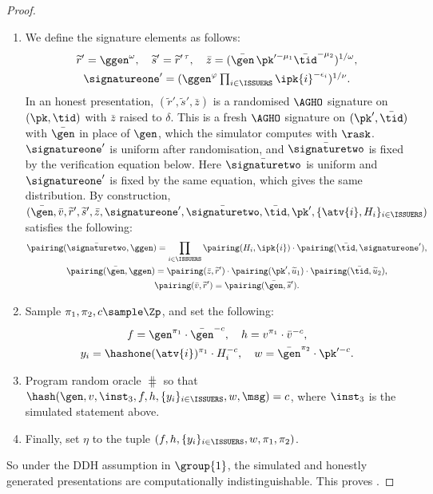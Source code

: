 \begin{proof}
\begin{enumerate}
    \item We define the signature elements as follows:
%
      \begin{gather*}
%
	\widetilde{r}' = \ggen^\omega, \quad \widetilde{s}' =
\widetilde{r}'^{\,\tau}, \quad \bar{z} = (\bar{\gen}\,\pk'^{-\mu_1}
\bar{\tid}^{-\mu_2})^{1/\omega}, \\ \signatureone' =
(\ggen^{\varphi}\textstyle\prod_{i \in \ISSUERS}\ipk{i}^{-\epsilon_i})^{1/\nu}.
%
      \end{gather*}
%
      In an honest presentation, $(\widetilde{r}', \widetilde{s}', \bar{z})$
is a randomised $\AGHO$ signature on $(\pk, \tid)$ with $\bar{z}$ raised to
$\delta$. This is a fresh $\AGHO$ signature on $(\pk', \bar{\tid})$ with
$\bar{\gen}$ in place of $\gen$, which the simulator computes with $\rask$.
$\signatureone'$ is uniform after randomisation, and $\bar{\signaturetwo}$ is
fixed by the verification equation below. Here $\bar{\signaturetwo}$ is uniform
and $\signatureone'$ is fixed by the same equation, which gives the same
distribution.
      By construction, $(\bar{\gen}, \bar{v}, \widetilde{r}',
\widetilde{s}', \bar{z}, \signatureone', \bar{\signaturetwo}, \bar{\tid}, \pk',
\{\atv{i}, H_i\}_{i\in \ISSUERS})$ satisfies the following:
      \begin{gather*}
	\pairing(\bar{\signaturetwo}, \ggen) =
\prod_{i\in\ISSUERS}\pairing(H_i,\ipk{i}) \cdot
\pairing(\bar{\tid},\signatureone'), \\
	\pairing(\bar{\gen},\ggen) = \pairing(\bar{z},\widetilde{r}')\cdot
\pairing(\pk',\widetilde{u}_1) \cdot \pairing(\bar{\tid},\widetilde{u}_2), \\
	\pairing(\bar{v},\widetilde{r}') = \pairing(\bar{\gen},\widetilde{s}').
      \end{gather*}

    \item Sample $\pi_1, \pi_2, c \sample \Zp$, and set the
following:
%
      \begin{gather*}
%
	f = \gen^{\pi_1}\cdot\bar{\gen}^{-c}, \quad h =
v^{\pi_1}\cdot\bar{v}^{-c}, \\ y_i = \hashone(\atv{i})^{\pi_1}\cdot H_i^{-c},
\quad w = \bar{\gen}^{\pi_2}\cdot\pk'^{-c}.
%
      \end{gather*}

        \item Program random oracle $\hash$ so that $\hash(\gen, v, \inst_3, f, h,
\{y_i\}_{i \in \ISSUERS}, w, \msg) = c$, where $\inst_3$ is the simulated
statement above.

    \item Finally, set $\eta$ to the tuple $(f, h, \{y_i\}_{i \in \ISSUERS}, w,
\pi_1, \pi_2)$.

  \end{enumerate}

  So under the DDH assumption in $\group{1}$, the simulated and honestly
generated presentations are computationally indistinguishable. This proves
.

\end{proof}

